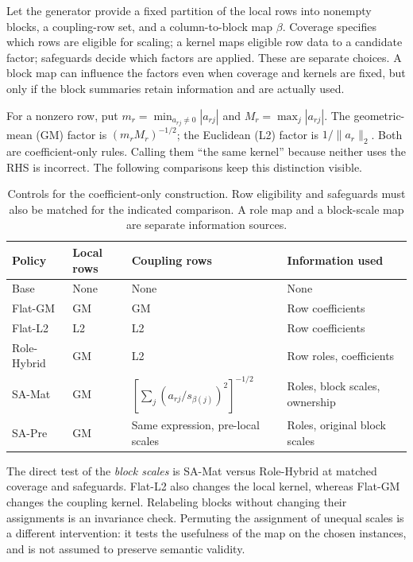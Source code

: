 \documentclass[11pt]{article}
\theoremstyle{definition}
\theoremstyle{remark}
\begin{document}
Let the generator provide a fixed partition of the local rows into nonempty blocks,
a coupling-row set, and a column-to-block map $\beta$. Coverage specifies which rows
are eligible for scaling; a kernel maps eligible row data to a candidate factor;
safeguards decide which factors are applied. These are separate choices. A block map
can influence the factors even when coverage and kernels are fixed, but only if the
block summaries retain information and are actually used.

For a nonzero row, put $m_r=\min_{a_{rj}\ne0}|a_{rj}|$ and
$M_r=\max_j|a_{rj}|$. The geometric-mean (GM) factor is $(m_rM_r)^{-1/2}$;
the Euclidean (L2) factor is $1/\|a_r\|_2$. Both are coefficient-only rules.
Calling them ``the same kernel'' because neither uses the RHS is incorrect.
The following comparisons keep this distinction visible.
\begin{table}[tb]
\centering\small
\caption{Controls for the coefficient-only construction. Row eligibility and safeguards
must also be matched for the indicated comparison. A role map and a block-scale map are
separate information sources.}\label{tab:policies}
\begin{tabularx}{\linewidth}{lXXX}
\toprule
Policy & Local rows & Coupling rows & Information used\\
\midrule
Base & None & None & None\\
Flat-GM & GM & GM & Row coefficients\\
Flat-L2 & L2 & L2 & Row coefficients\\
Role-Hybrid & GM & L2 & Row roles, coefficients\\
SA-Mat & GM & $\left[\sum_j(a_{rj}/s_{\beta(j)})^2\right]^{-1/2}$ & Roles, block scales, ownership\\
SA-Pre & GM & Same expression, pre-local scales & Roles, original block scales\\
\bottomrule
\end{tabularx}
\end{table}

The direct test of the \emph{block scales} is SA-Mat versus Role-Hybrid at matched
coverage and safeguards. Flat-L2 also changes the local kernel, whereas Flat-GM changes
the coupling kernel. Relabeling blocks without changing their assignments is an
invariance check. Permuting the assignment of unequal scales is a different intervention:
it tests the usefulness of the map on the chosen instances, and is not assumed to
preserve semantic validity.



\end{document}
